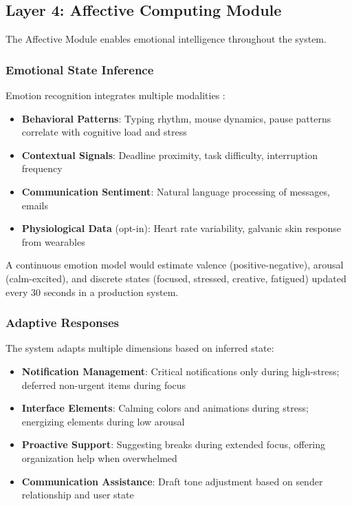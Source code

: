 \documentclass[conference]{IEEEtran}
\begin{document}
\subsection{Layer 4: Affective Computing Module}

The Affective Module enables emotional intelligence throughout the system.

\subsubsection{Emotional State Inference}

Emotion recognition integrates multiple modalities \cite{poria2017review}:

\begin{itemize}
\item \textbf{Behavioral Patterns}: Typing rhythm, mouse dynamics, pause patterns correlate with cognitive load and stress \cite{hernandez2014bioPhone}
\item \textbf{Contextual Signals}: Deadline proximity, task difficulty, interruption frequency
\item \textbf{Communication Sentiment}: Natural language processing of messages, emails
\item \textbf{Physiological Data} (opt-in): Heart rate variability, galvanic skin response from wearables
\end{itemize}

A continuous emotion model would estimate valence (positive-negative), arousal (calm-excited), and discrete states (focused, stressed, creative, fatigued) updated every 30 seconds in a production system.

\subsubsection{Adaptive Responses}

The system adapts multiple dimensions based on inferred state:

\begin{itemize}
\item \textbf{Notification Management}: Critical notifications only during high-stress; deferred non-urgent items during focus
\item \textbf{Interface Elements}: Calming colors and animations during stress; energizing elements during low arousal
\item \textbf{Proactive Support}: Suggesting breaks during extended focus, offering organization help when overwhelmed
\item \textbf{Communication Assistance}: Draft tone adjustment based on sender relationship and user state
\end{itemize}
\end{document}

